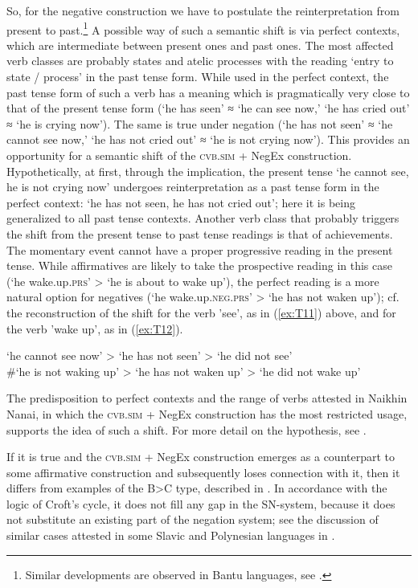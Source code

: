 \documentclass[output=paper,colorlinks,citecolor=brown]{langscibook}
\begin{document}
So, for the negative construction we have to postulate the reinterpretation from present to past.\footnote{Similar developments are observed in Bantu languages, see \citet[148]{Nurse2008}.} A possible way of such a semantic shift is via perfect contexts, which are intermediate between present ones and past ones. The most affected verb classes are probably states and atelic processes with the reading ‘entry to state / process’ in the past tense form. While used in the perfect context, the past tense form of such a verb has a meaning which is pragmatically very close to that of the present tense form (‘he has seen’ ≈ ‘he can see now,’ ‘he has cried out’ ≈ ‘he is crying now’). The same is true under negation (‘he has not seen’ ≈ ‘he cannot see now,’ ‘he has not cried out’ ≈ ‘he is not crying now’). This provides an opportunity for a semantic shift of the \textsc{cvb.sim} + NegEx construction. Hypothetically, at first, through the implication, the present tense ‘he cannot see, he is not crying now’ undergoes reinterpretation as a past tense form in the perfect context: ‘he has not seen, he has not cried out’; here it is being generalized to all past tense contexts. Another verb class that probably triggers the shift from the present tense to past tense readings is that of achievements. The momentary event cannot have a proper progressive reading in the present tense. While affirmatives are likely to take the prospective reading in this case (‘he wake.up.\textsc{prs}’ > ‘he is about to wake up’), the perfect reading is a more natural option for negatives (‘he wake.up.\textsc{neg.prs}’ > ‘he has not waken up’); cf. the reconstruction of the shift for the verb 'see’, as in (\ref{ex:T11}) above, and for the verb 'wake up’, as in (\ref{ex:T12}).

\begin{exe}
    \ex ‘he cannot see now’ > ‘he has not seen’ > ‘he did not see’\\
    \#‘he is not waking up’ > ‘he has not waken up’ > ‘he did not wake up’
\end{exe}

The predisposition to perfect contexts and the range of verbs attested in Naikhin Nanai, in which the \textsc{cvb.sim} + NegEx construction has the most restricted usage, supports the idea of such a shift. For more detail on the hypothesis, see \citet{oskolskaya2017a}.

If it is true and the \textsc{cvb.sim} + NegEx construction emerges as a counterpart to some affirmative construction and subsequently loses connection with it, then it differs from examples of the B>C type, described in \citet{Croft1991}. In accordance with the logic of Croft’s cycle, it does not fill any gap in the SN-system, because it does not substitute an existing part of the negation system; see the discussion of similar cases attested in some Slavic and Polynesian languages in \citet{Veselinova2014, Veselinova2016}.
\end{document}
